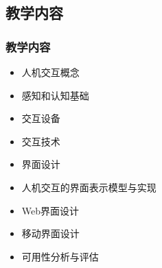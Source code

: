 \documentclass{beamer}
\begin{document}
\subsection{教学内容}
\begin{frame}
	\frametitle{教学内容}
	\begin{itemize}[<+-|alert@+>]
		\item 人机交互概念
		\item 感知和认知基础
		\item 交互设备
		\item 交互技术
		\item 界面设计 
		\item 人机交互的界面表示模型与实现
		\item Web界面设计
		\item 移动界面设计
		\item 可用性分析与评估
	\end{itemize}
\end{frame}
\end{document}
